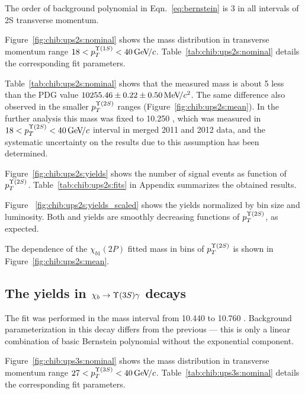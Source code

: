 The order of background polynomial in Eqn.~\ref{eq:bernstein} is 3 in all
intervals of \Y2S transverse momentum.


Figure~\ref{fig:chib:ups2s:nominal} shows the mass distribution in transverse
momentum range $18 < p_T^{\OneS} < 40 \gevc$. Table~\ref{tab:chib:ups2s:nominal}
details the corresponding fit parameters.




Table~\ref{tab:chib:ups2s:nominal} shows that the measured \chiboneTwoP mass is
about 5 \mevcc less than the PDG value $10255.46  \pm 0.22 \pm 0.50 {\mathrm{\,Me\kern -0.1em V\!/}c^2}$.
The same difference also observed in the smaller $p_T^{\Y2S}$ ranges
(Figure~\ref{fig:chib:ups2s:mean}).
In the further analysis this mass was fixed to 10.250 \gevcc, which was measured
in $18 < p_T^{\Y2S} < 40 \gevc$ interval in merged 2011 and 2012 data, and the
systematic uncertainty on the results due to this assumption has been
determined.



Figure~\ref{fig:chib:ups2s:yields} shows the number of signal events as function
of $p_T^{\Y2S}$. Table~\ref{tab:chib:ups2s:fits} in Appendix summarizes the
obtained results.



Figure ~\ref{fig:chib:ups2s:yields_scaled} shows the yields normalized by bin
size and luminosity. Both \chibTwoP and \chibThreeP yields are smoothly
decreasing functions of $p_T^{\Y2S}$, as expected.

The dependence of the $\chi_{b1}(2P)$ fitted mass in bins of $p_T^{\Y2S}$ is
shown in Figure~\ref{fig:chib:ups2s:mean}.


\subsection{The \texorpdfstring{\chib}{chib} yields in
	\texorpdfstring{$\chib \to \Y3S \gamma$}{chib --> Y(3S) gamma} decays}
\label{sec:chib:ups3s:fit}

The fit was performed in the mass interval from  10.440 to 10.760 \gevcc. 
Background parameterization in this decay differs from the previous ---
this is only a linear combination of basic Bernstein polynomial without the
exponential component.

Figure~\ref{fig:chib:ups3s:nominal} shows the mass distribution in transverse
momentum range $27<p_T^{\Y3S}<40\gevc$. Table~\ref{tab:chib:ups3s:nominal}
details the corresponding fit parameters.

